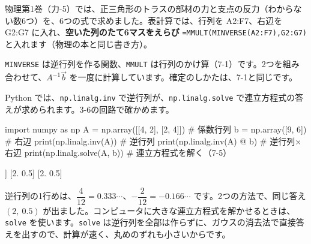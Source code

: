 物理第1巻（力-5）では、正三角形のトラスの部材の力と支点の反力（わからない数6つ）を、6つの式で求めました。表計算では、行列を A2:F7、右辺を G2:G7 に入れ、\textbf{空いた列のたて6マスをえらび} \texttt{=MMULT(MINVERSE(A2:F7),G2:G7)} と入れます（物理の本と同じ書き方）。
\begin{bkcenter}
\end{bkcenter}
\texttt{MINVERSE} は逆行列を作る関数、\texttt{MMULT} は行列のかけ算（7-1）です。2つを組み合わせて、$A^{-1}\vec b$ を一度に計算しています。確定のしかたは、7-1と同じです。

Python では、\texttt{np.linalg.inv} で逆行列が、\texttt{np.linalg.solve} で連立方程式の答えが求められます。3-6の回路で確かめます。
\begin{bkcode}[Python]
import numpy as np
A = np.array([[4, 2],
              [2, 4]])           \# 係数行列
b = np.array([9, 6])             \# 右辺
print(np.linalg.inv(A))          \# 逆行列
print(np.linalg.inv(A) @ b)      \# 逆行列×右辺
print(np.linalg.solve(A, b))     \# 連立方程式を解く（7-5）
\end{bkcode}
\begin{bkcodeout}[実行結果]
[[ 0.33333333 -0.16666667]
 [-0.16666667  0.33333333]]
[2.  0.5]
[2.  0.5]
\end{bkcodeout}
逆行列の1行めは、$\dfrac{4}{12}=0.333\cdots$、$-\dfrac{2}{12}=-0.166\cdots$ です。2つの方法で、同じ答え $(2,\ 0.5)$ が出ました。コンピュータに大きな連立方程式を解かせるときは、\texttt{solve} を使います。\texttt{solve} は逆行列を全部は作らずに、ガウスの消去法で直接答えを出すので、計算が速く、丸めのずれも小さいからです。

